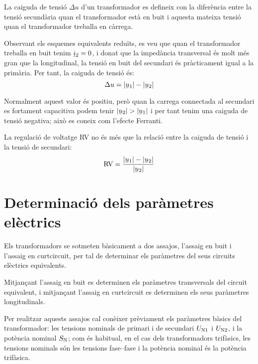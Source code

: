 La caiguda de tensió $\Delta u$ d'un transformador  es defineix con la diferència entre la tensió secundària quan el transformador està en buit i aquesta mateixa tensió quan el transformador treballa en càrrega.

Observant els esquemes equivalents reduïts, es veu que quan el transformador treballa en buit tenim $\cmplx{i}_2=0$, i donat que la impedància transversal és molt més gran que la longitudinal, la tensió en buit del secundari és pràcticament igual a la primària. Per tant, la caiguda de tensió és:
\begin{equation}
    \Delta u = |\cmplx{u}_1| - |\cmplx{u}_2|
\end{equation}

Normalment aquest valor és positiu, però quan la carrega connectada al secundari es fortament capacitiva podem tenir  $|\cmplx{u}_2| > |\cmplx{u}_1|$ i per tant tenim una caiguda de tensió negativa; això es coneix com l'efecte Ferranti.

La regulació de voltatge RV no és més que la relació entre la caiguda de tensió i la tensió de secundari:
\begin{equation}
    \text{RV} = \frac{|\cmplx{u}_1| - |\cmplx{u}_2|}{|\cmplx{u}_2|}
\end{equation}

\section{Determinació dels paràmetres elèctrics}\label{sec:determ-param-trafo}

Els transformadors se sotmeten bàsicament a dos assajos, l'assaig en
buit i l'assaig en curtcircuit, per tal de determinar els paràmetres
del seus circuits elèctrics equivalents.

Mitjançant l'assaig en buit es determinen els paràmetres
transversals del circuit equivalent, i mitjançant l'assaig en curtcircuit es determinen els seus paràmetres longitudinals.

Per  realitzar aquests assajos cal conèixer prèviament els paràmetres
bàsics del transformador: les tensions nominals de primari i de
secundari $U_\mathrm{N1}$ i $U_\mathrm{N2}$, i la potència nominal
$S_\mathrm{N}$; com és habitual, en el cas dels transformadors
trifàsics, les tensions nominals són les tensions fase--fase i la
potència nominal és la potència trifàsica.

